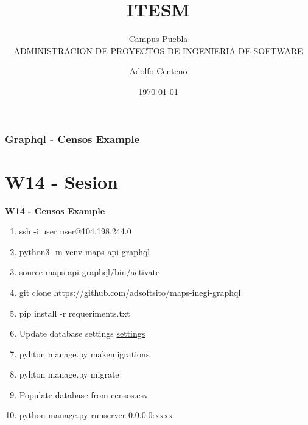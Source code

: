 \documentclass{beamer}
\begin{document}
\title{ITESM}  
\subtitle{Campus Puebla\\ADMINISTRACION DE PROYECTOS DE INGENIERIA DE SOFTWARE
}
\author{Adolfo Centeno}
\date{\today} 


\begin{frame}
\titlepage
\end{frame}

\begin{frame}\frametitle{Graphql -  Censos Example}
\tableofcontents
\end{frame} 


\section{W14 - Sesion }

\begin{frame}

    
\textbf{W14 - Censos Example}


\begin{enumerate}

\item
  ssh -i user user@104.198.244.0

\item
  python3 -m venv maps-api-graphql
  
\item
  source maps-api-graphql/bin/activate
  
\item
  git clone https://github.com/adsoftsito/maps-inegi-graphql  
  
\item
 pip install -r requeriments.txt
 
\item
  Update database settings       
    \href{https://github.com/adsoftsito/maps-inegi-graphql/blob/master/maps-inegi-graphql/settings.py}{settings}

\item
  pyhton manage.py makemigrations
  
\item
  pyhton manage.py migrate
  
\item
 Populate database from  \href{https://github.com/adsoftsito/maps-inegi-graphql/blob/master/dataset/censos.csv}{censos.csv}

\item
  python manage.py runserver 0.0.0.0:xxxx  
  
  
 
\end{enumerate}

	


\end{frame}
\end{document}
